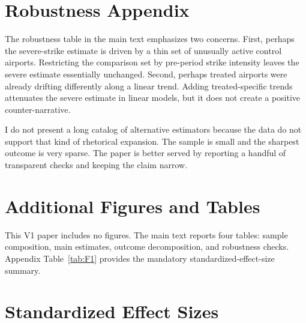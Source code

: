 \documentclass[12pt]{article}
\begin{document}
\section{Robustness Appendix}

The robustness table in the main text emphasizes two concerns. First, perhaps the severe-strike estimate is driven by a thin set of unusually active control airports. Restricting the comparison set by pre-period strike intensity leaves the severe estimate essentially unchanged. Second, perhaps treated airports were already drifting differently along a linear trend. Adding treated-specific trends attenuates the severe estimate in linear models, but it does not create a positive counter-narrative.

I do not present a long catalog of alternative estimators because the data do not support that kind of rhetorical expansion. The sample is small and the sharpest outcome is very sparse. The paper is better served by reporting a handful of transparent checks and keeping the claim narrow.

\section{Additional Figures and Tables}

This V1 paper includes no figures. The main text reports four tables: sample composition, main estimates, outcome decomposition, and robustness checks. Appendix Table~\ref{tab:F1} provides the mandatory standardized-effect-size summary.

\section{Standardized Effect Sizes}
\label{sec:sde}


\end{document}
